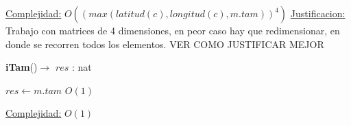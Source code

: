 \begin{Algoritmos}
\begin{algorithmic}[1]
\EndWhile

\medskip
\Statex \underline{Complejidad:} $O((max(latitud(c), longitud(c), m.tam))^4)$
\Statex \underline{Justificacion:} Trabajo con matrices de 4 dimensiones, en peor caso hay que redimensionar, en donde se recorren todos los elementos. VER COMO JUSTIFICAR MEJOR


\end{algorithmic}



\begin{algorithm}[H]
{\textbf{iTam}()$\to$ $res$ : nat}
\begin{algorithmic}[1]

\State $res \gets m.tam$ \Comment $O(1)$

\medskip
\Statex \underline{Complejidad:} $O(1)$

\end{algorithmic}
\end{algorithm}


  
\end{Algoritmos}